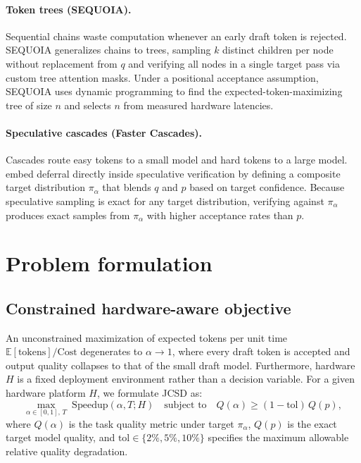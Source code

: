 \documentclass[10pt]{article}
\begin{document}
\paragraph{Token trees (SEQUOIA).} Sequential chains waste computation whenever an early draft token is rejected. SEQUOIA \citep{chen2024sequoia} generalizes chains to trees, sampling $k$ distinct children per node without replacement from $q$ and verifying all nodes in a single target pass via custom tree attention masks. Under a positional acceptance assumption, SEQUOIA uses dynamic programming to find the expected-token-maximizing tree of size $n$ and selects $n$ from measured hardware latencies.

\paragraph{Speculative cascades (Faster Cascades).} Cascades route easy tokens to a small model and hard tokens to a large model. \citet{narasimhan2025faster} embed deferral directly inside speculative verification by defining a composite target distribution $\pi_\alpha$ that blends $q$ and $p$ based on target confidence. Because speculative sampling is exact for any target distribution, verifying against $\pi_\alpha$ produces exact samples from $\pi_\alpha$ with higher acceptance rates than $p$.

\section{Problem formulation}

\subsection{Constrained hardware-aware objective}
An unconstrained maximization of expected tokens per unit time $\mathbb{E}[\text{tokens}] / \text{Cost}$ degenerates to $\alpha \to 1$, where every draft token is accepted and output quality collapses to that of the small draft model. Furthermore, hardware $H$ is a fixed deployment environment rather than a decision variable. For a given hardware platform $H$, we formulate JCSD as:
\begin{equation}
  \max_{\alpha \in [0, 1],\, T} \; \mathrm{Speedup}(\alpha, T; H) \quad \text{subject to} \quad Q(\alpha) \ge (1 - \mathrm{tol})\, Q(p),
  \label{eq:obj}
\end{equation}
where $Q(\alpha)$ is the task quality metric under target $\pi_\alpha$, $Q(p)$ is the exact target model quality, and $\mathrm{tol} \in \{2\%, 5\%, 10\%\}$ specifies the maximum allowable relative quality degradation.
\end{document}
